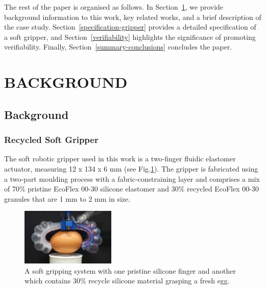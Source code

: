 \documentclass[letterpaper, 10 pt, conference]{ieeeconf}  %
\begin{document}
	The rest of the paper is organised as follows. 
	In Section~\ref{background-relatedwork}, we provide background information to this work, key related works, and a brief description of the case study. %
	Section~\ref{specification-gripper} provides a detailed specification of a soft gripper, and Section~\ref{verifiability} highlights the significance of promoting verifiability.
	Finally, Section~\ref{summary-conclusions} concludes the paper. 	
	
	\section{BACKGROUND}\label{background-relatedwork}
	
	\subsection{Background}\label{background}
	\subsubsection{Recycled Soft Gripper}
	The soft robotic gripper used in this work is a two-finger fluidic elastomer actuator, measuring 12 x 134 x 6 mm \cite{Partridge2022} (see Fig.\ref{gripper}). The gripper is fabricated using a two-part moulding process with a fabric-constraining layer and comprises a mix of 70\% pristine EcoFlex 00-30 silicone elastomer and 30\% recycled EcoFlex 00-30 granules that are 1 mm to 2 mm in size.%
	
	\begin{figure}
		\centering
		\includegraphics[width=0.4\textwidth]{figures/recycledsoftgripper.jpg}%
		\caption{A soft gripping system with one pristine silicone finger and another which contains 30\% recycle silicone material grasping a fresh egg.}
		\label{gripper}
		\vspace{-1.3ex}
	\end{figure}
	
\end{document}
